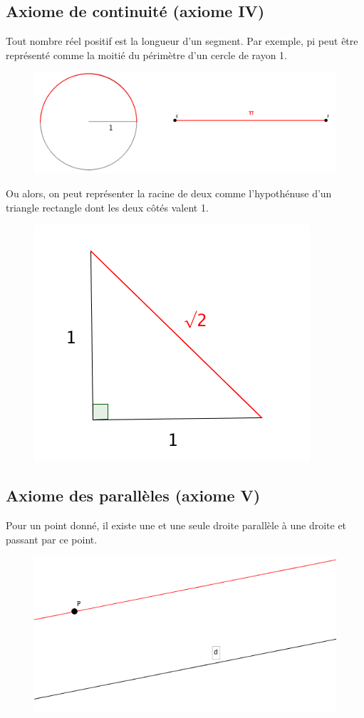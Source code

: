\documentclass[a4paper,12pt]{article}
\begin{document}
\subsection{Axiome de continuité (axiome IV)}
Tout nombre réel positif est la longueur d'un segment. Par exemple, pi peut être représenté comme la moitié du périmètre d'un cercle de rayon 1.
\begin{figure}[H]
    \centerline{\includegraphics[scale=0.4]{axiomes/pi.png}}
    \label{fig:fig2}
\end{figure}

\pagebreak
Ou alors, on peut représenter la racine de deux comme l'hypothénuse d'un triangle rectangle dont les deux côtés valent 1.
\begin{figure}[H]
    \centering
    \includegraphics[scale=0.6]{axiomes/racine2.png}
\end{figure}



\subsection{Axiome des parallèles (axiome V)}
Pour un point donné, il existe une et une seule droite parallèle à une droite et passant par ce point.
\begin{figure}[H]
    \centering
    \includegraphics[scale=0.6]{axiomes/parallel.png}
\end{figure}
\end{document}
